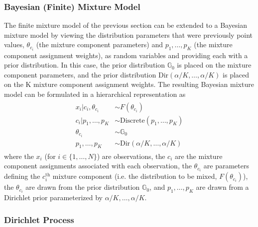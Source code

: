 \documentclass[smallcondensed, final]{svjour3}
\begin{document}
\subsubsection{Bayesian (Finite) Mixture Model}


The finite mixture model of the previous section can be extended to a Bayesian mixture model by viewing the distribution parameters that were previously point values, $\theta_{c_{i}}$ (the mixture component parameters) and $p_{1}, \ldots, p_{K}$ (the mixture component assignment weights), as random variables and providing each with a prior distribution. In this case, the prior distribution $\mathbb{G}_{0}$ is placed on the mixture component parameters, and the prior distribution $\text{Dir}(\alpha/K, \ldots, \alpha/K)$ is placed on the K mixture component assignment weights. The resulting Bayesian mixture model can be formulated in a hierarchical representation as
\begin{align}
\begin{split}
	\label{bayesian_mixture_model}
	x_{i}|c_{i}, \theta_{c_{i}}  &\sim  F(\theta_{c_{i}}) \\
	c_{i}|p_{1}, \ldots, p_{K}  &\sim  \text{Discrete}(p_{1}, \ldots, p_{K}) \\
	\theta_{c_{i}}  &\sim  \mathbb{G}_{0} \\
	p_{1}, \ldots, p_{K}  &\sim  \text{Dir}(\alpha/K, \ldots, \alpha/K)
\end{split}
\end{align}
where the $x_{i}$ (for $i \in \{ 1, \ldots, N \}$) are observations, the $c_{i}$ are the mixture component assignments associated with each observation, the $\theta_{c_{i}}$ are parameters defining the $c_{i}^{\text{th}}$ mixture component (i.e. the distribution to be mixed, $F(\theta_{c_{i}})$), the $\theta_{c_{i}}$ are drawn from the prior distribution $\mathbb{G}_{0}$, and $p_{1}, \ldots, p_{K}$ are drawn from a Dirichlet prior parameterized by $\alpha/K, \ldots, \alpha/K$.




\subsubsection{Dirichlet Process}

\end{document}
